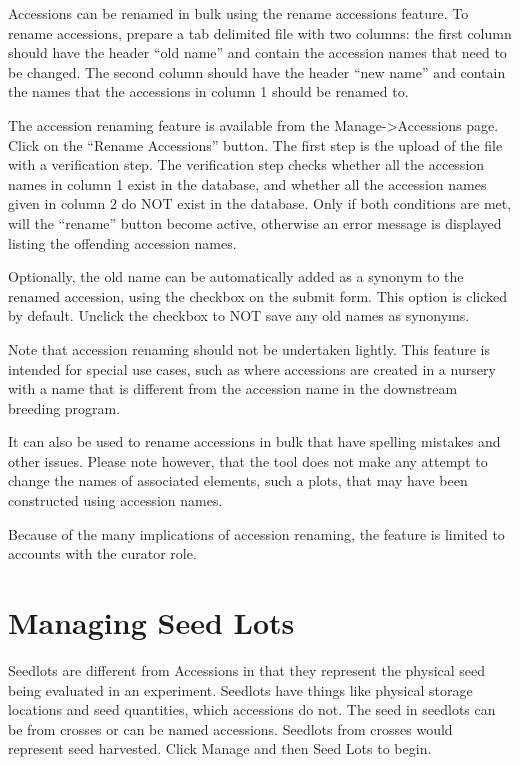 \documentclass[
  12pt,
]{book}
\begin{document}
Accessions can be renamed in bulk using the rename accessions feature. To rename accessions, prepare a tab delimited file with two columns: the first column should have the header ``old name'' and contain the accession names that need to be changed. The second column should have the header ``new name'' and contain the names that the accessions in column 1 should be renamed to.

The accession renaming feature is available from the Manage-\textgreater Accessions page. Click on the ``Rename Accessions'' button. The first step is the upload of the file with a verification step. The verification step checks whether all the accession names in column 1 exist in the database, and whether all the accession names given in column 2 do NOT exist in the database. Only if both conditions are met, will the ``rename'' button become active, otherwise an error message is displayed listing the offending accession names.

Optionally, the old name can be automatically added as a synonym to the renamed accession, using the checkbox on the submit form. This option is clicked by default. Unclick the checkbox to NOT save any old names as synonyms.

Note that accession renaming should not be undertaken lightly. This feature is intended for special use cases, such as where accessions are created in a nursery with a name that is different from the accession name in the downstream breeding program.

It can also be used to rename accessions in bulk that have spelling mistakes and other issues. Please note however, that the tool does not make any attempt to change the names of associated elements, such a plots, that may have been constructed using accession names.

Because of the many implications of accession renaming, the feature is limited to accounts with the curator role.

\hypertarget{managing-seed-lots}{%
\chapter{Managing Seed Lots}\label{managing-seed-lots}}

Seedlots are different from Accessions in that they represent the physical seed being evaluated in an experiment. Seedlots have things like physical storage locations and seed quantities, which accessions do not. The seed in seedlots can be from crosses or can be named accessions. Seedlots from crosses would represent seed harvested. Click Manage and then Seed Lots to begin.
\end{document}
